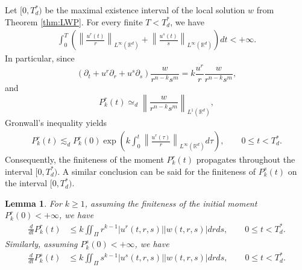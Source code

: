 \documentclass[11pt]{amsart}
\newtheorem{lem}[theorem]{Lemma}
\theoremstyle{definition}
\theoremstyle{remark}
\numberwithin{equation}{section}
\numberwithin{equation}{section}
\newcommand{\0}{\emptyset}
\begin{document}
Let $[0,T^{*}_d)$ be the maximal existence interval of the local solution $w$ from Theorem \ref{thm:LWP}. For every finite $T<T^{*}_d$, we have
\begin{align} \label{eq:bkm}
\int_0^{T} \left( \left\| \frac{u^r(t)}{r}  \right\|_{L^{\infty}(\mathbb{R}^d)} + \left\| \frac{u^s(t)}{s}  \right\|_{L^{\infty}(\mathbb{R}^d)} \right) dt < +\infty.
\end{align}
In particular, since
\begin{equation}
\left(\partial_t+u^r\partial_r+u^s\partial_s\right) \frac{w}{r^{n-k}s^{m}} = k\frac{u^r}{r}\frac{w}{r^{n-k}s^{m}},
\end{equation}
and \[ P_k^r(t)\simeq_d \left\| \frac{w}{r^{n-k}s^m} \right\|_{L^1(\mathbb R^d)}, \]
Gronwall's inequality yields
\begin{align} \label{eq:pr_fin} 
P_k^r(t) \lesssim_d P_k^r(0) \exp\left( k\int_0^t \left\| \frac{u^r(\tau)}{r} \right\|_{L^\infty(\mathbb R^d)} d\tau \right), \qquad 0\le t<T_d^*. 
\end{align}
Consequently, the finiteness of the moment $P_k^r(t)$ propagates throughout the interval $[0,T^*_d)$. A similar conclusion can be said for the finiteness of $P_k^s(t)$ on the interval $[0,T^*_d)$.
		
	\begin{lem} \label{lem:rsder}
	For $k\ge 1$, assuming the finiteness of the initial moment $P_k^r(0)<+\infty$, we have
		\begin{align} \label{eq:rder}
			\frac{d}{dt}P_{k}^{r}(t)&\leq k\iint_{\Pi}r^{k-1}|u^{r}(t,r,s)||w(t,r,s)|drds,  \qquad 0\le t<T^*_d.
		\end{align}
	Similarly, assuming $P_k^s(0)<+\infty$, we have 	
		\begin{align} \label{eq:sder}
		\frac{d}{dt}P_{k}^{s}(t)&\leq k\iint_{\Pi}s^{k-1}|u^{s}(t,r,s)||w(t,r,s)|drds, \qquad 0\le t<T^*_d.
		\end{align}
	\end{lem}
	
\end{document}

